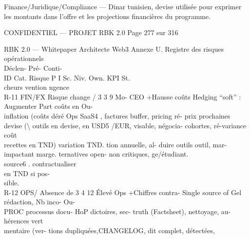 \documentclass[12pt,landscape,a4paper]{article}
\newenvironment{confidential}
{\begin{tcolorbox}[
    colback=rbkred!5!white,
    colframe=rbkred!75!black,
    title=CONFIDENTIEL,
    fonttitle=\bfseries\color{white},
    coltitle=rbkred!75!black,
    breakable,
    enhanced,
    frame hidden,
    borderline west={2pt}{0pt}{rbkred!75!black}
]}
{\end{tcolorbox}}
\begin{document}
Finance/Juridique/Compliance — Dinar tunisien, devise utilisée pour exprimer les montants dans l’offre et les projections financières du programme.\\
\vspace{0.5em}
\vspace{0.5em}
\begin{confidential}CONFIDENTIEL — PROJET RBK 2.0                                                                                              Page 277 sur 316\end{confidential}
RBK 2.0 — Whitepaper Architecte Web3                                                                                                                   Annexe U. Registre des risques opérationnels\\
\vspace{0.5em}
\vspace{0.5em}
Déclen-           Pré-               Conti-\\
ID         Cat.     Risque           P I Sc. Niv. Own.                                                               KPI            St.\\
cheurs            vention            ngence\\
R-11       FIN/FX   Risque change / 3 3 9      Mo- CEO      +Hausse     coûts Hedging “soft” : Augmenter             Part coûts en Ou-\\
inflation (coûts           déré Ops      SaaS4 , factures buffer, pricing ré- prix prochaines devise      (\textbackslash{}%
outils en devise,                        en USD5 /EUR, visable, négocia- cohortes,           ré-variance coût\\
recettes en TND)                         variation TND. tion annuelle, al- duire          outils outil,   mar-\\
impactant marge.                                          ternatives open- non        critiques, ge/étudiant.\\
source6 .           contractualiser\\
en TND si pos-\\
sible.\\
R-12       OPS/     Absence        de 3 4 12 Élevé Ops      +Chiffres contra- Single source of Gel       rédaction, Nb       inco- Ou-\\
PROC     processus docu-                HoP       dictoires,   sec- truth (Factsheet), nettoyage,    au- hérences      vert\\
mentaire     (ver-                       tions dupliquées,CHANGELOG, dit              complet, détectées,\\
\end{document}

